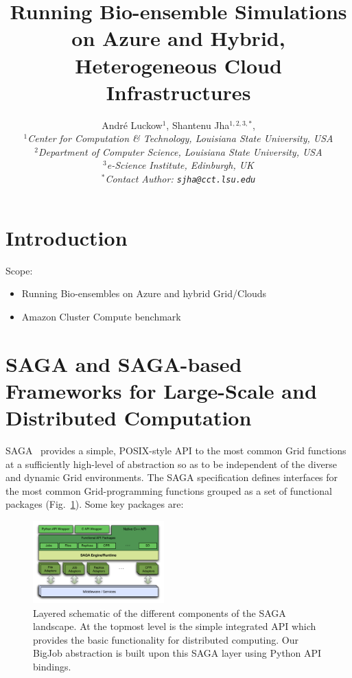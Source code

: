 \documentclass[conference,final]{IEEEtran}
\title{Running Bio-ensemble Simulations on Azure and Hybrid, Heterogeneous Cloud Infrastructures}
\author{
Andr\'e Luckow$^{1}$, Shantenu Jha$^{1,2,3,*}$,\\
  \small{\emph{$^{1}$Center for Computation \& Technology, Louisiana State University, USA}}\\
  \small{\emph{$^{2}$Department of Computer Science, Louisiana State University, USA}}\\
  \small{\emph{$^{3}$e-Science Institute, Edinburgh, UK}}\\
  \small{\emph{$^{*}$Contact Author: \texttt{sjha@cct.lsu.edu}}}\\
}
\newcommand{\up}{\vspace*{-1em}}
\begin{document}
 

\maketitle    

\begin{abstract}
  
\end{abstract}

\section{Introduction}

Scope:
\begin{itemize}
    \item Running Bio-ensembles on Azure and hybrid Grid/Clouds
    \item Amazon Cluster Compute benchmark
\end{itemize}


\section{SAGA and SAGA-based Frameworks for Large-Scale and
  Distributed Computation} 

SAGA~\cite{saga_url} provides a simple, POSIX-style API to the most
common Grid functions at a sufficiently high-level of abstraction so
as to be independent of the diverse and dynamic Grid environments. The
SAGA specification defines interfaces for the most common
Grid-programming functions grouped as a set of functional packages
(Fig.~\ref{Fig:SAGA1}). Some key packages are:

\begin{figure}[!ht]
 \begin{center}
     \includegraphics[width=0.45\textwidth]{figures/stci_saga_figures-1.pdf}
 \end{center}
\caption{\small Layered schematic of the different components of the
   SAGA landscape. At the topmost level is the simple integrated API
   which provides the basic functionality for distributed
   computing. Our BigJob abstraction is built upon this SAGA layer
   using Python API bindings.\up} \label{Fig:SAGA1}
\end{figure}
\end{document}
